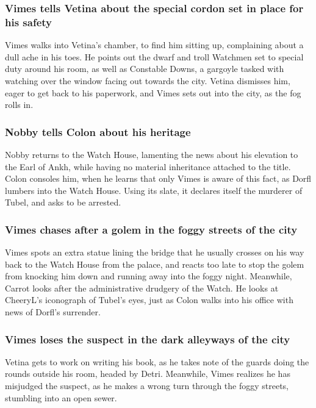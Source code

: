 \subsubsection{\Gls{Vimes} tells \Gls{Vetina} about the special cordon set in place for his safety}
\Gls{Vimes} walks into \Gls{Vetina}'s chamber, to find him sitting up, complaining about a dull
ache in his toes. He points out the dwarf and troll Watchmen set to special duty around his room,
as well as Constable \Gls{Downs}, a gargoyle tasked with watching over the window facing out towards
the city. \Gls{Vetina} dismisses him, eager to get back to his paperwork, and \Gls{Vimes} sets out
into the city, as the fog rolls in.

\subsubsection{\Gls{Nobby} tells \Gls{Colon} about his heritage}
\Gls{Nobby} returns to the Watch House, lamenting the news about his elevation to the Earl of
Ankh, while having no material inheritance attached to the title. \Gls{Colon} consoles him, when he
learns that only \Gls{Vimes} is aware of this fact, as \Gls{Dorfl} lumbers into the Watch House.
Using its slate, it declares itself the murderer of \Gls{Tubel}, and asks to be arrested.

\subsubsection{\Gls{Vimes} chases after a golem in the foggy streets of the city}
\Gls{Vimes} spots an extra statue lining the bridge that he usually crosses on his way back to the
Watch House from the palace, and reacts too late to stop the golem from knocking him down and
running away into the foggy night. Meanwhile, \Gls{Carrot} looks after the administrative drudgery
of the Watch. He looks at \Gls{CheeryL}'s iconograph of \Gls{Tubel}'s eyes, just as \Gls{Colon}
walks into his office with news of \Gls{Dorfl}'s surrender.

\subsubsection{\Gls{Vimes} loses the suspect in the dark alleyways of the city}
\Gls{Vetina} gets to work on writing his book, as he takes note of the guards doing the rounds
outside his room, headed by \Gls{Detri}. Meanwhile, \Gls{Vimes} realizes he has misjudged the
suspect, as he makes a wrong turn through the foggy streets, stumbling into an open sewer.

